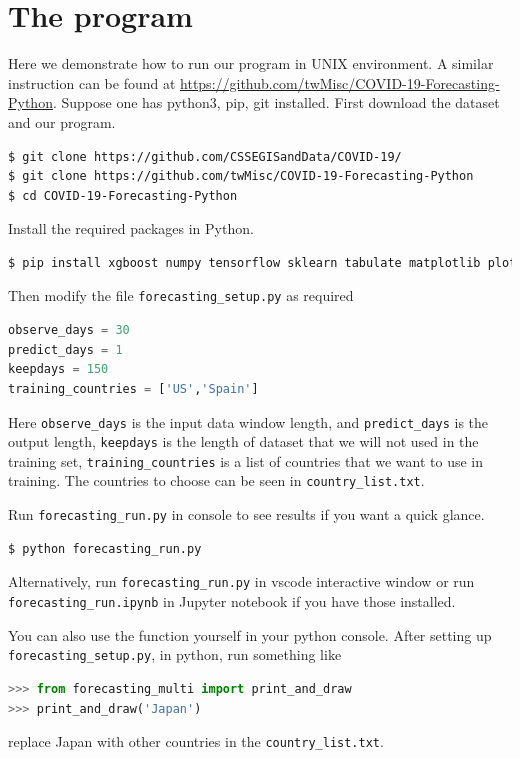 \documentclass[a4paper,12pt]{article}
\begin{document}
\section{The program}
Here we demonstrate how to run our program in UNIX environment. A similar instruction can be found at \href{https://github.com/twMisc/COVID-19-Forecasting-Python}{https://github.com/twMisc/COVID-19-Forecasting-Python}. Suppose one has python3, pip, git installed. First download the dataset and our program. 
\lstset{style=mystyle}
\begin{lstlisting}[language=bash]
$ git clone https://github.com/CSSEGISandData/COVID-19/
$ git clone https://github.com/twMisc/COVID-19-Forecasting-Python
$ cd COVID-19-Forecasting-Python
\end{lstlisting}
Install the required packages in Python.
\begin{lstlisting}[language=bash]
$ pip install xgboost numpy tensorflow sklearn tabulate matplotlib plotly pandas
\end{lstlisting}

Then modify the file \texttt{forecasting\_setup.py} as required
\begin{lstlisting}[language=Python]
observe_days = 30
predict_days = 1
keepdays = 150
training_countries = ['US','Spain']
\end{lstlisting}
Here \texttt{observe\_days} is the input data window length, and \texttt{predict\_days} is the output length, \texttt{keepdays} is the length of dataset that we will not used in the training set, \texttt{training\_countries} is a list of countries that we want to use in training. The countries to choose can be seen in \texttt{country\_list.txt}.

Run \texttt{forecasting\_run.py} in console to see results if you want a quick glance.
\begin{lstlisting}[language=bash]
$ python forecasting_run.py
\end{lstlisting}

Alternatively, run \texttt{forecasting\_run.py} in vscode interactive window or run \texttt{forecasting\_run.ipynb} in Jupyter notebook if you have those installed. 

You can also use the function yourself in your python console. After setting up \texttt{forecasting\_setup.py}, in python, run something like
\begin{lstlisting}[language=Python]
>>> from forecasting_multi import print_and_draw
>>> print_and_draw('Japan') 
\end{lstlisting}
replace Japan with other countries in the \texttt{country\_list.txt}.
\end{document}
